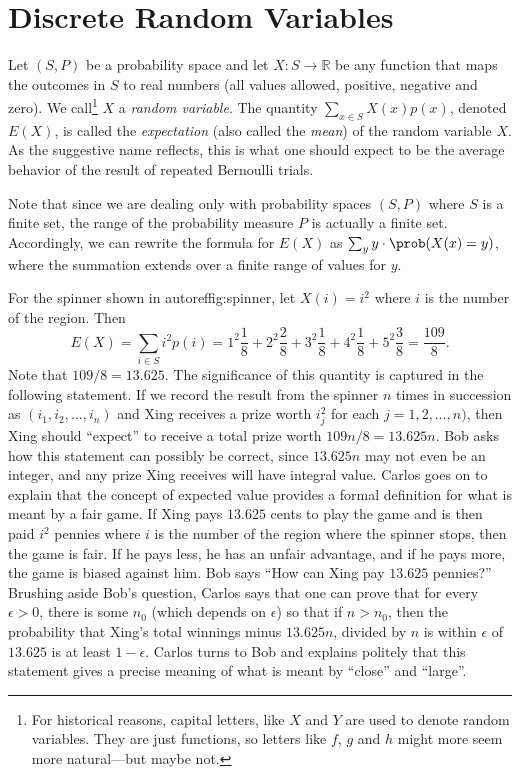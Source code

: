 \section{Discrete Random Variables}

Let $(S,P)$ be a probability space and let $X:S\longrightarrow\mathbb{R}$ be
any function that maps the outcomes in $S$ to real numbers (all values allowed,
positive, negative and zero).  We call\footnote{For historical
reasons, capital letters, like $X$ and $Y$ are used to denote random
variables.  They are just functions, so letters like $f$, $g$ and $h$
might more seem more natural---but maybe not.} $X$ a \textit{random variable}.
The quantity $\sum_{x\in S} X(x)p(x)$, denoted $E(X)$, is called the
\textit{expectation} (also called the \textit{mean}) of the random 
variable $X$.  As the suggestive name reflects, this is what one should 
expect to be the average behavior of the result of repeated Bernoulli trials.  

Note that since we are dealing only with probability spaces $(S,P)$ where
$S$ is a finite set, the range of the probability measure $P$ is actually
a finite set.  Accordingly, we can rewrite the formula for $E(X)$ as 
$\sum_y y\cdot \prob(X(x)=y)$, where the summation extends over a finite
range of values for $y$.

\begin{example}
For the spinner shown in autoref{fig:spinner}, let $X(i)=i^2$ where
$i$ is the number of the region.  Then 
\[
E(X)=\sum_{i\in S} i^2p(i)=1^2\frac{1}{8}+2^2\frac{2}{8}+3^2\frac{1}{8}+
   4^2\frac{1}{8}+5^2\frac{3}{8}=\frac{109}{8}.
\]
Note that $109/8=13.625$.  The significance of this quantity is captured
in the following statement.  If we record the result from the spinner
$n$ times in succession as $(i_1,i_2,\dots,i_n)$ and Xing receives
a prize worth $i_j^2$ for each $j=1,2,\dots,n)$, then Xing should ``expect''
to receive a total prize worth $109n/8=13.625n$.  
Bob asks how this statement can possibly be correct, since $13.625n$ may not 
even be an integer, and any prize Xing receives will have integral value.
Carlos goes on to explain that the concept of expected value provides
a formal definition for what is meant by a fair game.  If Xing
pays $13.625$ cents to play the game and is then paid $i^2$ pennies where
$i$ is the number of the region where the spinner stops, then the
game is fair.  If he pays less, he has an unfair advantage, and if he
pays more, the game is biased against him.  
Bob says ``How can Xing pay $13.625$ pennies?''
Brushing aside Bob's question, Carlos says that one
can prove that for every $\epsilon >0$, there is
some $n_0$ (which depends on $\epsilon$) so that if $n>n_0$, then the 
probability that Xing's total winnings minus $13.625n$, divided by $n$ is 
within $\epsilon$ of $13.625$ is at least $1-\epsilon$.  Carlos turns
to Bob and explains politely that this statement gives a precise 
meaning of what is meant by ``close'' and ``large''.
\end{example}

